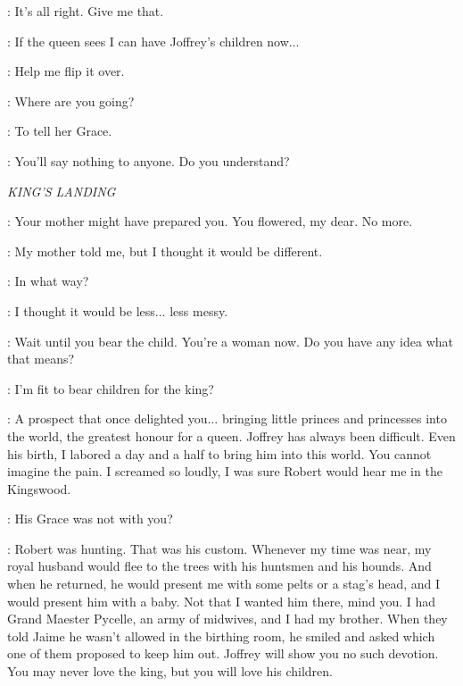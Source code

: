 
\SHAE: It's all right. Give me that.


\SANSA: If the queen sees I can have Joffrey's children now$\ldots$

\SHAE: Help me flip it over.



\SHAE: Where are you going?

\HANDMAID: To tell her Grace.


\SHAE: You'll say nothing to anyone. Do you understand?



\scene

\textit{KING'S LANDING}


\CERSEI: Your mother might have prepared you. You flowered, my dear. No more.

\SANSA: My mother told me, but I thought it would be different.

\CERSEI: In what way?

\SANSA: I thought it would be less$\ldots$ less messy.

\CERSEI: Wait until you bear the child. You're a woman now. Do you have any idea what that means?

\SANSA: I'm fit to bear children for the king?

\CERSEI: A prospect that once delighted you$\ldots$ bringing little princes and princesses into the world, the greatest honour for a queen. Joffrey has always been difficult. Even his birth, I labored a day and a half to bring him into this world. You cannot imagine the pain. I screamed so loudly, I was sure Robert would hear me in the Kingswood.

\SANSA: His Grace was not with you?

\CERSEI: Robert was hunting. That was his custom. Whenever my time was near, my royal husband would flee to the trees with his huntsmen and his hounds. And when he returned, he would present me with some pelts or a stag's head, and I would present him with a baby. Not that I wanted him there, mind you. I had Grand Maester Pycelle, an army of midwives, and I had my brother. When they told Jaime he wasn't allowed in the birthing room, he smiled and asked which one of them proposed to keep him out. Joffrey will show you no such devotion. You may never love the king, but you will love his children.

